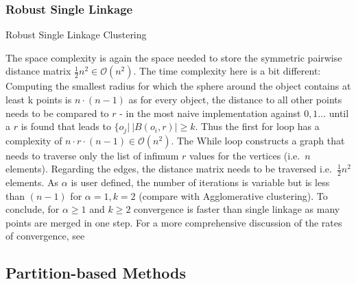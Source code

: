 \subsubsection{Robust Single Linkage}\label{\positionnumber}
\begin{algorithm}[htp]
    \hrulealg
\caption{Robust Single Linkage Clustering}\label{robust}
\end{algorithm}
The space complexity is again the space needed to store the symmetric pairwise distance matrix $\frac{1}{2}n^2 \in \mathcal{O}(n^2)$. The time complexity here is a bit different: Computing the smallest radius for which the sphere around the object contains at least k points is $n \cdot (n - 1)$ as for every object, the distance to all other points needs to be compared to $r$ - in the most naive implementation against $0, 1 \dots$ until a $r$ is found that leads to $\{o_j | \ |B(o_i, r)| \geq k$. Thus the first for loop has a complexity of $n \cdot r \cdot (n-1) \in \mathcal{O}(n^2)$. The While loop constructs a graph that needs to traverse only the list of infimum $r$ values for the vertices (i.e.~$n$ elements). Regarding the edges, the distance matrix needs to be traversed i.e.~$\frac{1}{2}n^2$ elements. As $\alpha$ is user defined, the number of iterations is variable but is less than $(n-1)$ for $\alpha = 1, k = 2$ (compare with Agglomerative clustering). To conclude, for $\alpha \geq 1$ and $k \geq 2$ convergence is faster than single linkage as many points are merged in one step. For a more comprehensive discussion of the rates of convergence, see~\cite{Chaudhuri2010RatesOC}



\subsection{Partition-based Methods}\label{\positionnumber}
